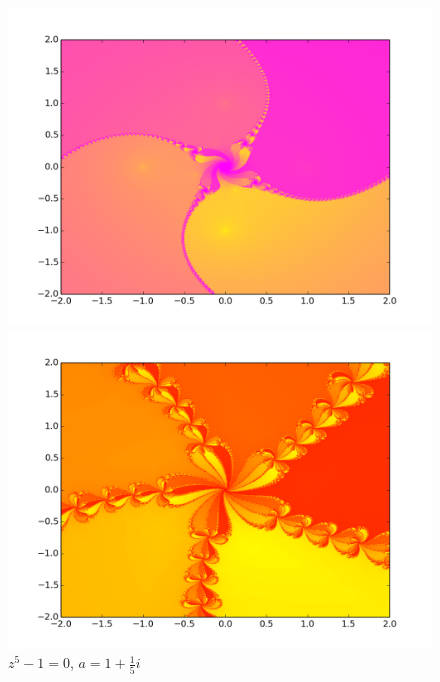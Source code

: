 \documentclass[12pt]{article}
\begin{document}
\begin{figure}[ht]
  \begin{minipage}[b]{0.5\linewidth}
    \centering
    \includegraphics[width=1\linewidth]{fractal_350_1500_4.png} 
    \caption*{$z^4 - 1 = 0$, $a = \frac{1}{10} + \frac{1}{10}i$} 
    \vspace{4ex}
  \end{minipage}%
  \begin{minipage}[b]{0.5\linewidth}
    \centering
    \includegraphics[width=1\linewidth]{fractal_100_1500_5.png} 
    \caption*{$z^5 - 1 = 0$, $a = 1 + \frac{1}{5}i$}
    \vspace{4ex}
  \end{minipage} 
\end{figure}
\end{document}
